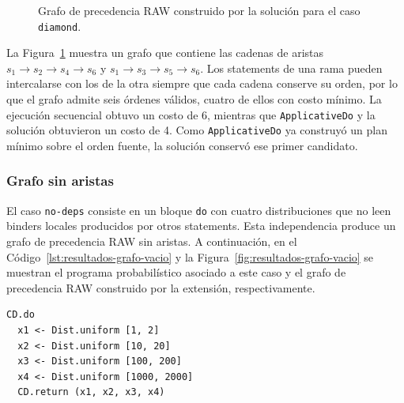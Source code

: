 \begin{figure}[ht]
\centering
\begingroup
\setgraphnodesize{1.55cm}{1.0cm}{8pt}
\begin{PrecedenceGraph}[node distance=0.45cm and 0.35cm]
\end{PrecedenceGraph}
\endgroup
\caption[Grafo RAW del caso \texttt{diamond}.]{Grafo de precedencia RAW construido por la solución para el caso \texttt{diamond}.}
\label{fig:resultados-grafo-diamante}
\end{figure}

La Figura~\ref{fig:resultados-grafo-diamante} muestra un grafo que contiene las cadenas de aristas $s_1\to s_2\to s_4\to s_6$ y $s_1\to s_3\to s_5\to s_6$. Los statements de una rama pueden intercalarse con los de la otra siempre que cada cadena conserve su orden, por lo que el grafo admite seis órdenes válidos, cuatro de ellos con costo mínimo. La ejecución secuencial obtuvo un costo de 6, mientras que \texttt{ApplicativeDo} y la solución obtuvieron un costo de 4. Como \texttt{ApplicativeDo} ya construyó un plan mínimo sobre el orden fuente, la solución conservó ese primer candidato.

\subsubsection{Grafo sin aristas}

El caso \texttt{no-deps} consiste en un bloque \texttt{do} con cuatro distribuciones que no leen binders locales producidos por otros statements. Esta independencia produce un grafo de precedencia RAW sin aristas. A continuación, en el Código~\ref{lst:resultados-grafo-vacio} y la Figura~\ref{fig:resultados-grafo-vacio} se muestran el programa probabilístico asociado a este caso y el grafo de precedencia RAW construido por la extensión, respectivamente.

\begin{lstlisting}[style=haskell,caption={Programa probabilístico asociado al caso \texttt{no-deps}.},label={lst:resultados-grafo-vacio}]
CD.do
  x1 <- Dist.uniform [1, 2]
  x2 <- Dist.uniform [10, 20]
  x3 <- Dist.uniform [100, 200]
  x4 <- Dist.uniform [1000, 2000]
  CD.return (x1, x2, x3, x4)
\end{lstlisting}

